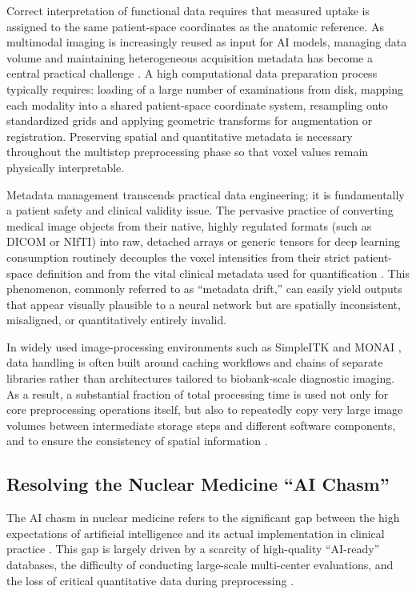 \documentclass[a4paper,10pt]{elsarticle}
\begin{document}
Correct interpretation of functional data requires that measured uptake is assigned to the same patient-space coordinates as the anatomic reference. As multimodal imaging is increasingly reused as input for AI models, managing data volume and maintaining heterogeneous acquisition metadata has become a central practical challenge  \cite{MillerKuronuma2022}. A high computational data preparation process typically requires: loading of a large number of examinations from disk, mapping each modality into a shared patient-space coordinate system, resampling onto standardized grids and applying geometric transforms for augmentation or registration. Preserving spatial and quantitative metadata is necessary throughout the multistep preprocessing phase so that voxel values remain physically interpretable. 

Metadata management transcends practical data engineering; it is fundamentally a patient safety and clinical validity issue. The pervasive practice of converting medical image objects from their native, highly regulated formats (such as DICOM or NIfTI) into raw, detached arrays or generic tensors for deep learning consumption routinely decouples the voxel intensities from their strict patient-space definition and from the vital clinical metadata used for quantification  \cite{JhaBradshaw2022}. This phenomenon, commonly referred to as ``metadata drift,'' can easily yield outputs that appear visually plausible to a neural network but are spatially inconsistent, misaligned, or quantitatively entirely invalid.

In widely used image-processing environments such as SimpleITK  \cite{LowekampChen2013} and MONAI  \cite{KraljevicSearle2021}, data handling is often built around caching workflows and chains of separate libraries rather than architectures tailored to biobank-scale diagnostic imaging. As a result, a substantial fraction of total processing time is used not only for core preprocessing operations itself, but also to repeatedly copy very large image volumes between intermediate storage steps and different software components, and to ensure the consistency of spatial information \cite{Dexl_2025}.

\subsection*{Resolving the Nuclear Medicine ``AI Chasm''}
The AI chasm in nuclear medicine refers to the significant gap between the high expectations of artificial intelligence and its actual implementation in clinical practice  \cite{MillerKuronuma2022}. This gap is largely driven by a scarcity of high-quality ``AI-ready'' databases, the difficulty of conducting large-scale multi-center evaluations, and the loss of critical quantitative data during preprocessing  \cite{JhaBradshaw2022}.
\end{document}
